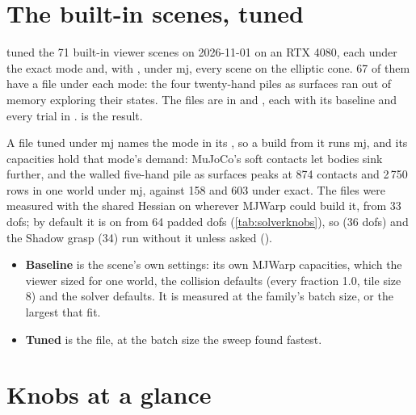 \section{The built-in scenes, tuned}\label{sec:builtin}

 tuned the 71 built-in viewer scenes on 2026-11-01 on an RTX 4080, each under the exact mode and, with , under mj, every scene on the elliptic cone. 67 of them have a file under each mode: the four twenty-hand piles as surfaces ran out of memory exploring their states. The files are in  and , each with its baseline and every trial in .  is the result.

A file tuned under mj names the mode in its , so a build from it runs mj, and its capacities hold that mode's demand: MuJoCo's soft contacts let bodies sink further, and the walled five-hand pile as surfaces peaks at 874 contacts and 2\,750 rows in one world under mj, against 158 and 603 under exact. The files were measured with the shared Hessian on wherever MJWarp could build it, from 33 dofs; by default it is on from 64 padded dofs (\cref{tab:solverknobs}), so  (36 dofs) and the Shadow grasp (34) run without it unless asked ().

\begin{itemize}
\item \textbf{Baseline} is the scene's own settings: its own MJWarp capacities, which the viewer sized for one world, the collision defaults (every fraction 1.0, tile size 8) and the solver defaults. It is measured at the family's batch size, or the largest that fit.
\item \textbf{Tuned} is the file, at the batch size the sweep found fastest.
\end{itemize}



\begingroup\small

\endgroup



\section{Knobs at a glance}\label{sec:glance}

